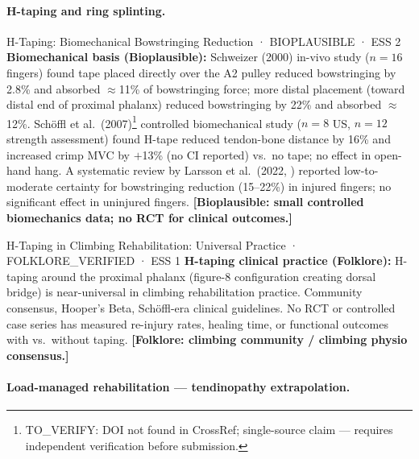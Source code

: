 \paragraph{H-taping and ring splinting.}\leavevmode

\begin{bioplausbox}{H-Taping: Biomechanical Bowstringing Reduction · BIOPLAUSIBLE · ESS 2}
\textbf{Biomechanical basis (Bioplausible):} Schweizer (2000) in-vivo study ($n=16$ fingers) found tape placed directly over the A2 pulley reduced bowstringing by 2.8\% and absorbed $\approx$11\% of bowstringing force; more distal placement (toward distal end of proximal phalanx) reduced bowstringing by 22\% and absorbed $\approx$12\%. Sch\"{o}ffl et al.\ (2007)\footnote{TO\_VERIFY: DOI not found in CrossRef; single-source claim --- requires independent verification before submission.} controlled biomechanical study ($n=8$ US, $n=12$ strength assessment) found H-tape reduced tendon-bone distance by 16\% and increased crimp MVC by $+$13\% (no CI reported) vs.\ no tape; no effect in open-hand hang. A systematic review by Larsson et al.\ (2022, \cite{LNB22}) reported low-to-moderate certainty for bowstringing reduction (15--22\%) in injured fingers; no significant effect in uninjured fingers. \textbf{[Bioplausible: small controlled biomechanics data; no RCT for clinical outcomes.]}
\end{bioplausbox}

\begin{folklorebox}{H-Taping in Climbing Rehabilitation: Universal Practice · FOLKLORE\_VERIFIED · ESS 1}
\textbf{H-taping clinical practice (Folklore):} H-taping around the proximal phalanx (figure-8 configuration creating dorsal bridge) is near-universal in climbing rehabilitation practice. Community consensus, Hooper's Beta, Schöffl-era clinical guidelines. No RCT or controlled case series has measured re-injury rates, healing time, or functional outcomes with vs.\ without taping. \textbf{[Folklore: climbing community / climbing physio consensus.]}
\end{folklorebox}

\paragraph{Load-managed rehabilitation --- tendinopathy extrapolation.}\leavevmode

